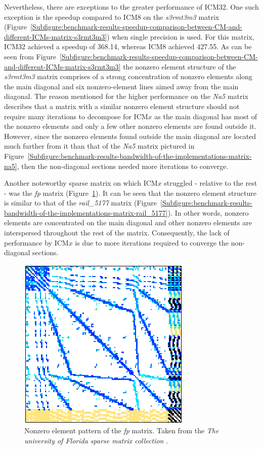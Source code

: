 Nevertheless, there are exceptions to the greater performance of ICM32. One such exception is the speedup compared to ICM8 on the \textit{s3rmt3m3} matrix (Figure~\ref{Subfigure:benchmark-results-speedup-comparison-between-CM-and-different-ICMs-matrix-s3rmt3m3}) when single precision is used. For this matrix, ICM32 achieved a speedup of 368.14, whereas ICM8 achieved 427.55. As can be seen from Figure~\ref{Subfigure:benchmark-results-speedup-comparison-between-CM-and-different-ICMs-matrix-s3rmt3m3} the nonzero element structure of the \textit{s3rmt3m3} matrix comprises of a strong concentration of nonzero elements along the main diagonal and six nonzero-element lines aimed away from the main diagonal. The reason mentioned for the higher performance on the \textit{Na5} matrix describes that a matrix with a similar nonzero element structure should not require many iterations to decompose for ICM$ x $ as the main diagonal has most of the nonzero elements and only a few other nonzero elements are found outside it. However, since the nonzero elements found outside the main diagonal are located much further from it than that of the \textit{Na5} matrix pictured in Figure~\ref{Subfigure:benchmark-results-bandwidth-of-the-implementations-matrix-na5}, then the non-diagonal sections needed more iterations to converge.
\par Another noteworthy sparse matrix on which ICM$ x $ struggled - relative to the rest - was the \textit{fp} matrix (Figure~\ref{Figure:benchmark-results-speedup-comparison-between-CM-and-different-ICMs-matrix-fp}). It can be seen that the nonzero element structure is similar to that of the \textit{rail\_5177} matrix (Figure~\ref{Subfigure:benchmark-results-bandwidth-of-the-implementations-matrix-rail_5177}). In other words, nonzero elements are concentrated on the main diagonal and other nonzero elements are interspersed throughout the rest of the matrix. Consequently, the lack of performance by ICM$ x $ is due to more iterations required to converge the non-diagonal sections.

\begin{figure}[h!]
	\centering
	\includegraphics[width=.35\textwidth, keepaspectratio, clip]{images/ch3/matrices/fp.png}
	\caption{Nonzero element pattern of the \mbox{\textit{fp}} matrix. Taken from the \emph{The university of Florida sparse matrix collection} \cite{Davis2011}.}
	\label{Figure:benchmark-results-speedup-comparison-between-CM-and-different-ICMs-matrix-fp}
\end{figure}

